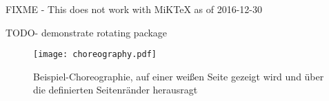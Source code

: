   \clearpage

  FIXME - This does not work with MiKTeX as of 2016-12-30

  TODO- demonstrate rotating package

  \thispagestyle{empty}


  \addtolength{\textwidth}{2cm}
  \addtolength{\evensidemargin}{-1cm}

  \begin{landscape}
    \begin{figure}
      \centering
      \texttt{[image: choreography.pdf]}
      \caption{Beispiel-Choreographie, auf einer weißen Seite gezeigt wird und über die definierten Seitenränder herausragt}
    \end{figure}
  \end{landscape}


\fi

